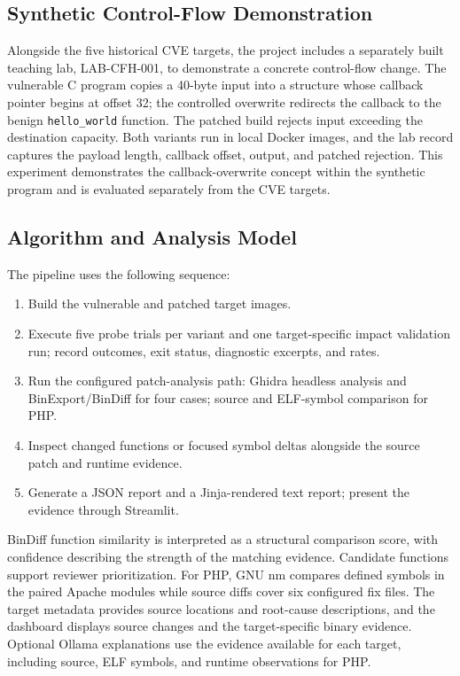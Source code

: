 \documentclass[conference]{IEEEtran}
\begin{document}
\subsection{Synthetic Control-Flow Demonstration}
Alongside the five historical CVE targets, the project includes a separately built teaching lab, LAB-CFH-001, to demonstrate a concrete control-flow change. The vulnerable C program copies a 40-byte input into a structure whose callback pointer begins at offset 32; the controlled overwrite redirects the callback to the benign \texttt{hello\_world} function. The patched build rejects input exceeding the destination capacity. Both variants run in local Docker images, and the lab record captures the payload length, callback offset, output, and patched rejection. This experiment demonstrates the callback-overwrite concept within the synthetic program and is evaluated separately from the CVE targets.

\subsection{Algorithm and Analysis Model}
The pipeline uses the following sequence:
\begin{enumerate}
  \item Build the vulnerable and patched target images.
  \item Execute five probe trials per variant and one target-specific impact validation run; record outcomes, exit status, diagnostic excerpts, and rates.
  \item Run the configured patch-analysis path: Ghidra headless analysis and BinExport/BinDiff for four cases; source and ELF-symbol comparison for PHP.
  \item Inspect changed functions or focused symbol deltas alongside the source patch and runtime evidence.
  \item Generate a JSON report and a Jinja-rendered text report; present the evidence through Streamlit.
\end{enumerate}

BinDiff function similarity is interpreted as a structural comparison score, with confidence describing the strength of the matching evidence. Candidate functions support reviewer prioritization. For PHP, GNU nm compares defined symbols in the paired Apache modules while source diffs cover six configured fix files. The target metadata provides source locations and root-cause descriptions, and the dashboard displays source changes and the target-specific binary evidence. Optional Ollama explanations use the evidence available for each target, including source, ELF symbols, and runtime observations for PHP.
\end{document}
